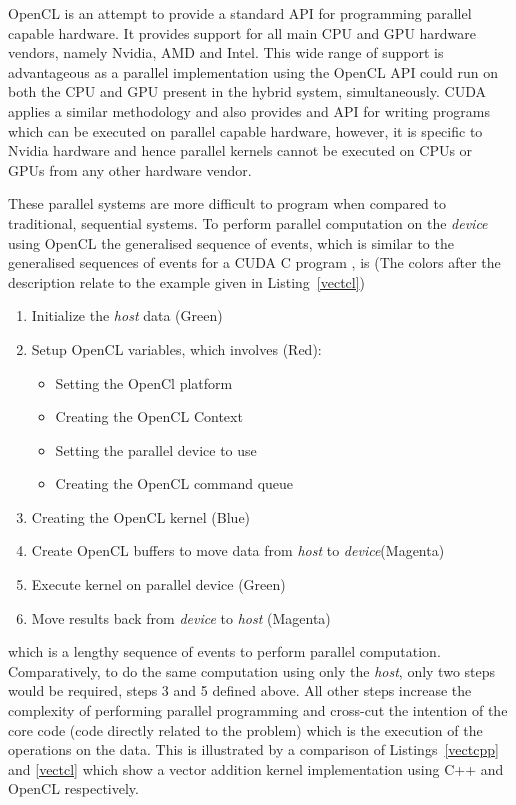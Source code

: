 \documentclass{sig-alternate-05-2015}
\begin{document}
OpenCL is an attempt to provide a standard API for programming parallel capable
hardware. It provides support for all main CPU and GPU hardware vendors, namely 
Nvidia, AMD and Intel. This wide range of support is advantageous as a 
parallel implementation using the OpenCL API could run on both the CPU and GPU
present in the hybrid system, simultaneously. CUDA applies a similar methodology 
and also provides and API for writing programs which can be executed on parallel capable
hardware, however, it is specific to Nvidia hardware and hence parallel kernels
cannot be executed on CPUs or GPUs from any other hardware vendor.

These parallel systems are more difficult to 
program when compared to traditional, sequential systems. To perform parallel
computation on the \textit{device} using OpenCL the generalised sequence of
events, which is similar to the generalised sequences of events for a CUDA C
program \cite{cudaseq}, is (The colors after the description relate to the
example given in Listing~\ref{vectcl})
\begin{enumerate}
	\item{Initialize the \textit{host} data (Green)}
	\item{Setup OpenCL variables, which involves (Red):
			\begin{itemize}
				\item{Setting the OpenCl platform }
				\item{Creating the OpenCL Context }
				\item{Setting the parallel device to use }
				\item{Creating the OpenCL command queue }
		\end{itemize} }
	\item{Creating the OpenCL kernel (Blue)}
	\item{Create OpenCL buffers to move data from \textit{host} to
		\textit{device}(Magenta)}
	\item{Execute kernel on parallel device (Green)}
	\item{Move results back from \textit{device} to \textit{host} (Magenta)}
\end{enumerate}
which is a lengthy sequence of events to perform parallel computation.
Comparatively, to do the same computation using only the \textit{host}, only two
steps would be required, steps 3 and 5 defined above. All other steps increase
the complexity of performing parallel programming and cross-cut the intention of
the core code (code directly related to the problem) which is the execution of
the operations on the data. This is illustrated by a comparison of
Listings~\ref{vectcpp} and \ref{vectcl} which show a vector addition kernel
implementation using C++ and OpenCL respectively.
\end{document}
